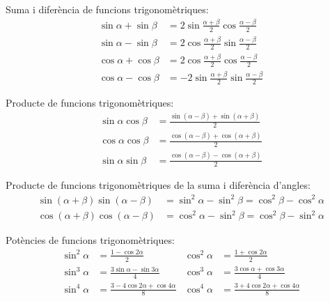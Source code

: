 Suma i diferència de funcions trigonomètriques:
\begin{subequations}
\begin{align}
    \sin\alpha+\sin\beta &= 2 \sin\frac{\alpha+\beta}{2}
    \cos\frac{\alpha-\beta}{2}\\[1ex]
    \sin\alpha-\sin\beta &= 2 \cos\frac{\alpha+\beta}{2}
    \sin\frac{\alpha-\beta}{2}\\[1ex]
    \cos\alpha+\cos\beta &= 2 \cos\frac{\alpha+\beta}{2}
    \cos\frac{\alpha-\beta}{2}\\[1ex]
    \cos\alpha-\cos\beta &= -2 \sin\frac{\alpha+\beta}{2}
    \sin\frac{\alpha-\beta}{2}
\end{align}
\end{subequations}

Producte de funcions trigonomètriques:
\begin{subequations}
\begin{align}
    \sin\alpha \cos\beta &=
    \frac{\sin(\alpha-\beta)+\sin(\alpha+\beta)}{2}\\[1ex]
    \cos\alpha \cos\beta &=
    \frac{\cos(\alpha-\beta)+\cos(\alpha+\beta)}{2}\label{eq:cos-cos}\\[1ex]
    \sin\alpha \sin\beta &=
    \frac{\cos(\alpha-\beta)-\cos(\alpha+\beta)}{2}
\end{align}
\end{subequations}

Producte de funcions trigonomètriques de la suma i diferència
d'angles:
\begin{subequations}
\begin{align}
    \sin(\alpha+\beta) \sin(\alpha-\beta) &= \sin^2\alpha-\sin^2\beta =
    \cos^2\beta - \cos^2\alpha\\[1ex]
    \cos(\alpha+\beta) \cos(\alpha-\beta) &= \cos^2\alpha-\sin^2\beta =
    \cos^2\beta - \sin^2\alpha
\end{align}
\end{subequations}

Potències de funcions trigonomètriques:
\begin{subequations}
\begin{align}
    \sin^2\alpha &= \frac{1-\cos 2\alpha}{2} &  \cos^2\alpha &= \frac{1+\cos 2\alpha}{2}\\[1ex]
    \sin^3\alpha &= \frac{3\sin\alpha-\sin 3\alpha}{4} &  \cos^3\alpha &= \frac{3\cos\alpha+\cos 3\alpha}{4}\\[1ex]
    \sin^4\alpha &= \frac{3-4\cos 2\alpha+\cos 4\alpha}{8} &  \cos^4\alpha &= \frac{3+4\cos 2\alpha+\cos 4\alpha}{8}
\end{align}
\end{subequations}

